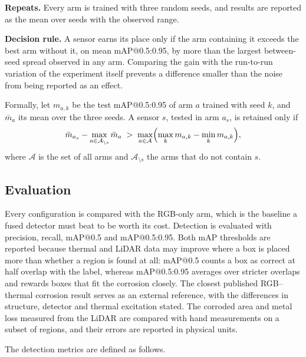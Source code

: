 \textbf{Repeats.} Every arm is trained with three random seeds, and results are
reported as the mean over seeds with the observed range.

\textbf{Decision rule.} A sensor earns its place only if the arm containing it
exceeds the best arm without it, on mean mAP@0.5:0.95, by more than the largest
between-seed spread observed in any arm. Comparing the gain with the run-to-run
variation of the experiment itself prevents a difference smaller than the noise
from being reported as an effect.

Formally, let $m_{a,k}$ be the test mAP@0.5:0.95 of arm $a$ trained with seed
$k$, and $\bar{m}_a$ its mean over the three seeds. A sensor $s$, tested in
arm $a_s$, is retained only if
\begin{equation}
\bar{m}_{a_s} - \max_{a \in \mathcal{A}_{\setminus s}} \bar{m}_a \;>\;
\max_{a \in \mathcal{A}} \Bigl( \max_k m_{a,k} - \min_k m_{a,k} \Bigr),
\label{eq:decision}
\end{equation}
where $\mathcal{A}$ is the set of all arms and $\mathcal{A}_{\setminus s}$ the
arms that do not contain $s$.

\subsection{Evaluation}
\label{sec:evaluation}

Every configuration is compared with the RGB-only arm, which is the baseline a
fused detector must beat to be worth its cost. Detection is evaluated with
precision, recall, mAP@0.5 and mAP@0.5:0.95. Both mAP thresholds are reported
because thermal and LiDAR data may improve where a box is placed more than
whether a region is found at all: mAP@0.5 counts a box as correct at half
overlap with the label, whereas mAP@0.5:0.95 averages over stricter overlaps and
rewards boxes that fit the corrosion closely.
The closest published RGB--thermal corrosion result \citep{Lim2021} serves as an
external reference, with the differences in structure, detector and thermal
excitation stated. The corroded area and metal loss measured from the LiDAR are
compared with hand measurements on a subset of regions, and their errors are
reported in physical units.

The detection metrics are defined as follows.

